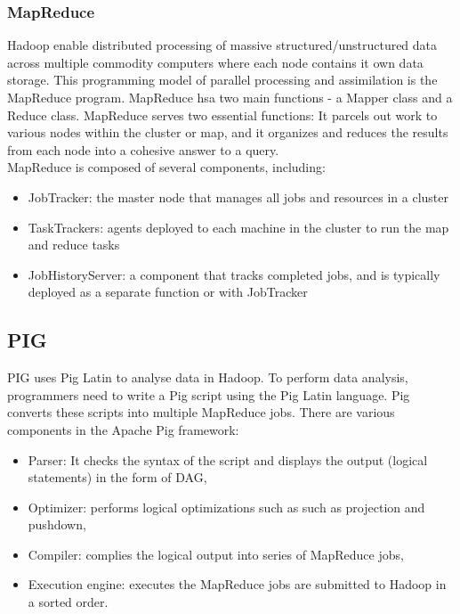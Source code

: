 \documentclass[9pt,twocolumn,twoside]{../../styles/osajnl}
\begin{document}
\subsubsection{MapReduce}
Hadoop enable distributed processing of massive structured/unstructured data across multiple commodity computers where each node contains it own data storage. This programming model of parallel processing and assimilation is the MapReduce program. MapReduce hsa two main functions - a Mapper class and a Reduce class. MapReduce serves two essential functions: It parcels out work to various nodes within the cluster or map, and it organizes and reduces the results from each node into a cohesive answer to a query. \\

MapReduce is composed of several components, including:
\begin{itemize}
    \item JobTracker: the master node that manages all jobs and resources in a cluster
    \item TaskTrackers: agents deployed to each machine in the cluster to run the map and reduce tasks
    \item JobHistoryServer: a component that tracks completed jobs, and is typically deployed as a separate function or with JobTracker

\end{itemize}
    



\subsection{PIG}
PIG uses Pig Latin to analyse data in Hadoop. To perform data analysis, programmers need to write a Pig script using the Pig Latin language. Pig converts these scripts into multiple MapReduce jobs. There are various components in the Apache Pig framework:
\begin{itemize}
    \item Parser: It checks the syntax of the script and displays the output (logical statements) in the form of DAG, 
    \item Optimizer: performs logical optimizations such as such as projection and pushdown, 
    \item Compiler: complies the logical output into series of MapReduce jobs, 
    \item Execution engine: executes the MapReduce jobs are submitted to Hadoop in a sorted order.
\end{itemize}
\end{document}
